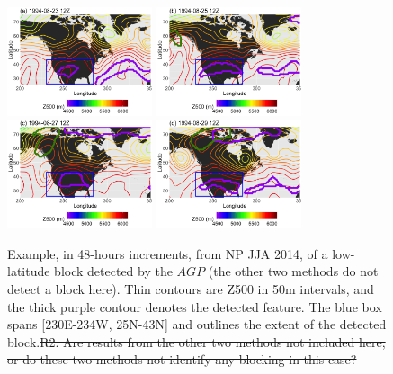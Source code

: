 \documentclass[smallextended]{svjour3}       %
\numberwithin{equation}{section}
\begin{document}
\begin{figure}
\centering
\includegraphics[width=0.38\textwidth]{fig10a}
\includegraphics[width=0.38\textwidth]{fig10b}\\
\includegraphics[width=0.38\textwidth]{fig10c}
\includegraphics[width=0.38\textwidth]{fig10d}
\caption{Example, in 48-hours increments, from NP JJA 2014, of a low-latitude block detected by the $AGP$ (the other two methods do not detect a block here). Thin contours are Z500 in 50m intervals, and the thick purple contour denotes the detected feature. The blue box spans [230E-234W, 25N-43N] and outlines the extent of the detected block.{\color{teal}\sout{R2: Are results from the other two methods not included here, or do these two methods not identify any blocking in this case?}}}\label{lowlatjja}
\end{figure} 
\end{document}
